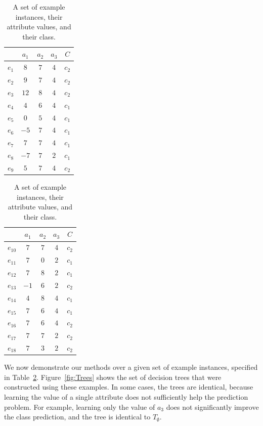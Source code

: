 \documentclass[letterpaper]{article}
\theoremstyle{definition}
\begin{document}
\begin{table}
\centering
\scriptsize
\caption{A set of example instances, their attribute values, and their class.}
\label{tbl:examples}
\begin{tabular}{|c||c|c|c|c|}
\hline
	&$a_1$	&$a_2$	&$a_3$	&$C$	\\ \hline\hline
$e_1$	&$8$	&$7$	&$4$	&$c_2$	\\ \hline
$e_2$	&$9$	&$7$	&$4$	&$c_2$	\\ \hline
$e_3$	&$12$	&$8$	&$4$	&$c_2$	\\ \hline
$e_4$	&$4$	&$6$	&$4$	&$c_1$	\\ \hline
$e_5$	&$0$	&$5$	&$4$	&$c_1$	\\ \hline
$e_6$	&$-5$	&$7$	&$4$	&$c_1$	\\ \hline
$e_7$	&$7$	&$7$	&$4$	&$c_1$	\\ \hline
$e_8$	&$-7$	&$7$	&$2$	&$c_1$	\\ \hline
$e_9$	&$5$	&$7$	&$4$	&$c_2$	\\ \hline
\end{tabular}
\quad
\begin{tabular}{|c||c|c|c|c|}
\hline
	&$a_1$	&$a_2$	&$a_3$	&$C$	\\ \hline\hline
$e_{10}$	&$7$	&$7$	&$4$	&$c_2$	\\ \hline
$e_{11}$	&$7$	&$0$	&$2$	&$c_1$	\\ \hline
$e_{12}$	&$7$	&$8$	&$2$	&$c_1$	\\ \hline
$e_{13}$	&$-1$	&$6$	&$2$	&$c_2$	\\ \hline
$e_{14}$	&$4$	&$8$	&$4$	&$c_1$	\\ \hline
$e_{15}$	&$7$	&$6$	&$4$	&$c_1$	\\ \hline
$e_{16}$	&$7$	&$6$	&$4$	&$c_2$	\\ \hline
$e_{17}$	&$7$	&$7$	&$2$	&$c_2$	\\ \hline
$e_{18}$	&$7$	&$3$	&$2$	&$c_2$	\\ \hline
\end{tabular}
\end{table}


We now demonstrate our methods over a given set of example instances, specified in Table~\ref{tbl:examples}.
Figure~\ref{fig:Trees} shows the set of decision trees that were constructed using these examples. In some cases, the trees are identical, because learning the value of a single attribute does not sufficiently help the prediction problem. For example, learning only the value of $a_3$ does not significantly improve the class prediction, and the tree is identical to $T_\emptyset$.
\end{document}
